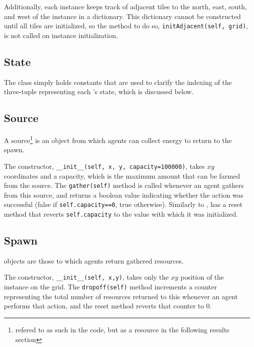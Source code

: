 \documentclass[11pt]{article}
\begin{document}
Additionally, each  instance keeps track of adjacent tiles to the north, east, south, and west of the instance in a dictionary. This dictionary cannot be constructed until all tiles are initialized, so the method to do so, \texttt{initAdjacent(self, grid)}, is not called on instance initialization.

\subsection{State}

The class  simply holds constants that are used to clarify the indexing of the three-tuple representing each 's state, which is discussed below.

\subsection{Source}

A source\footnote{refered to as such in the code, but as a resource in the following results section} is an object from which agents can collect energy to return to the spawn.

The constructor, \texttt{__init__(self, x, y, capacity=100000)}, takes $xy$ coordinates and a capacity, which is the maximum amount that can be farmed from the source. The \texttt{gather(self)} method is called whenever an agent gathers from this source, and returns a boolean value indicating whether the action was successful (false if \texttt{self.capacity==0}, true otherwise). Similarly to ,  has a reset method that reverts \texttt{self.capacity} to the value with which it was initialized.

\subsection{Spawn}

 objects are those to which agents return gathered resources.

The constructor, \texttt{__init__(self, x,y)}, takes only the $xy$ position of the  instance on the grid. The \texttt{dropoff(self)} method increments a counter representing the total number of resources returned to this  whenever an agent performs that action, and the reset method reverts that counter to 0.
\end{document}
